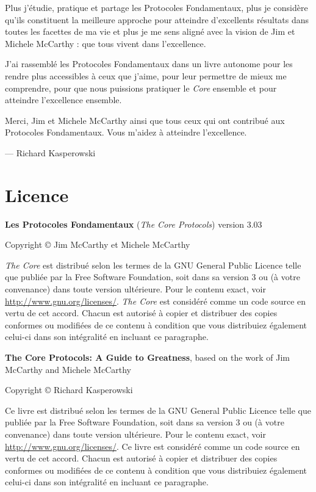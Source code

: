 \documentclass[paper=6in:9in,pagesize=pdftex,headinclude=on,footinclude=on,12pt]{scrbook}
\begin{document}
Plus j'étudie, pratique et partage les Protocoles Fondamentaux, plus je considère qu'ils constituent la meilleure approche pour
atteindre d'excellents résultats dans toutes les facettes de ma vie et plus je me sens aligné avec la vision de Jim et Michele McCarthy :
que tous vivent dans l'excellence.

J'ai rassemblé les Protocoles Fondamentaux dans un livre autonome pour les rendre plus accessibles à ceux que j'aime, pour
leur permettre de mieux me comprendre, pour que nous puissions pratiquer le \emph{Core} ensemble et pour atteindre
l'excellence ensemble.

Merci, Jim et Michele McCarthy ainsi que tous ceux qui ont contribué aux Protocoles Fondamentaux. Vous m'aidez à atteindre
l'excellence.

--- Richard Kasperowski


\chapter{Licence}

\begin{samepage}
	\noindent \textbf{Les Protocoles Fondamentaux} (\emph{The Core Protocols}) version 3.03

	\noindent Copyright \copyright{} Jim McCarthy et Michele McCarthy

	\noindent \emph{The Core} est distribué selon les termes de la GNU General Public Licence telle que publiée par la Free Software
	Foundation, soit dans sa version 3 ou (à votre convenance) dans toute version ultérieure. Pour le contenu exact, voir
	\url{http://www.gnu.org/licenses/}. \emph{The Core} est considéré comme un code source en vertu de cet accord. Chacun est autorisé
	à copier et distribuer des copies conformes ou modifiées de ce contenu à condition que vous distribuiez également celui-ci
	dans son intégralité en incluant ce paragraphe.
\end{samepage}

\begin{samepage}
	\noindent \textbf{The Core Protocols: A Guide to Greatness}, based on the work of Jim McCarthy and Michele McCarthy

	\noindent Copyright \copyright{} Richard Kasperowski

	\noindent Ce livre est distribué selon les termes de la GNU General Public Licence telle que publiée par la Free Software
	Foundation, soit dans sa version 3 ou (à votre convenance) dans toute version ultérieure. Pour le contenu exact, voir
	\url{http://www.gnu.org/licenses/}. Ce livre est considéré comme un code source en vertu de cet accord. Chacun est autorisé
	à copier et distribuer des copies conformes ou modifiées de ce contenu à condition que vous distribuiez également celui-ci
	dans son intégralité en incluant ce paragraphe.
\end{samepage}
\end{document}
